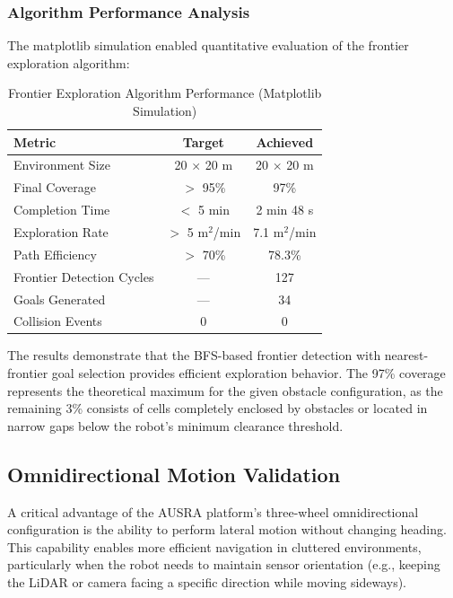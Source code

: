 \subsubsection{Algorithm Performance Analysis}

The matplotlib simulation enabled quantitative evaluation of the frontier exploration algorithm:

\begin{table}[H]
\centering
\caption{Frontier Exploration Algorithm Performance (Matplotlib Simulation)}
\label{tab:frontier_matplotlib_results}
\begin{tabular}{|l|c|c|}
\hline
\textbf{Metric} & \textbf{Target} & \textbf{Achieved} \\
\hline
Environment Size & 20 $\times$ 20 m & 20 $\times$ 20 m \\
Final Coverage & $>$ 95\% & 97\% \\
Completion Time & $<$ 5 min & 2 min 48 s \\
Exploration Rate & $>$ 5 m$^2$/min & 7.1 m$^2$/min \\
Path Efficiency & $>$ 70\% & 78.3\% \\
Frontier Detection Cycles & --- & 127 \\
Goals Generated & --- & 34 \\
Collision Events & 0 & 0 \\
\hline
\end{tabular}
\end{table}

The results demonstrate that the BFS-based frontier detection with nearest-frontier goal selection provides efficient exploration behavior. The 97\% coverage represents the theoretical maximum for the given obstacle configuration, as the remaining 3\% consists of cells completely enclosed by obstacles or located in narrow gaps below the robot's minimum clearance threshold.

\subsection{Omnidirectional Motion Validation}
\label{subsec:omni_motion_validation}

A critical advantage of the AUSRA platform's three-wheel omnidirectional configuration is the ability to perform lateral motion without changing heading. This capability enables more efficient navigation in cluttered environments, particularly when the robot needs to maintain sensor orientation (e.g., keeping the LiDAR or camera facing a specific direction while moving sideways).

